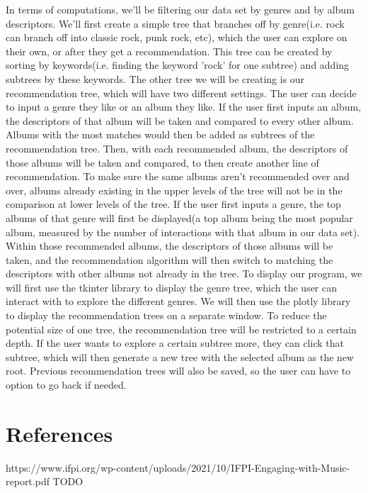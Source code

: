 \documentclass[fontsize=11pt]{article}
\begin{document}
In terms of computations, we'll be filtering our data set by genres and by album descriptors. We'll first create a simple tree that branches off by genre(i.e. rock can branch off into classic rock, punk rock, etc), which the user can explore on their own, or after they get a recommendation. This tree can be created by sorting by keywords(i.e. finding the keyword 'rock' for one subtree) and adding subtrees by these keywords. The other tree we will be creating is our recommendation tree, which will have two different settings. The user can decide to input a genre they like or an album they like. If the user first inputs an album, the descriptors of that album will be taken and compared to every other album. Albums with the most matches would then be added as subtrees of the recommendation tree. Then, with each recommended album, the descriptors of those albums will be taken and compared, to then create another line of recommendation. To make sure the same albums aren't recommended over and over, albums already existing in the upper levels of the tree will not be in the comparison at lower levels of the tree. If the user first inputs a genre, the top albums of that genre will first be displayed(a top album being the most popular album, measured by the number of interactions with that album in our data set). Within those recommended albums, the descriptors of those albums will be taken, and the recommendation algorithm will then switch to matching the descriptors with other albums not already in the tree.
    To display our program, we will first use the tkinter library to display the genre tree, which the user can interact with to explore the different genres. We will then use the plotly library to display the recommendation trees on a separate window. To reduce the potential size of one tree, the recommendation tree will be restricted to a certain depth. If the user wants to explore a certain subtree more, they can click that subtree, which will then generate a new tree with the selected album as the new root. Previous recommendation trees will also be saved, so the user can have to option to go back if needed.

\section*{References}
https://www.ifpi.org/wp-content/uploads/2021/10/IFPI-Engaging-with-Music-report.pdf
TODO

\end{document}
